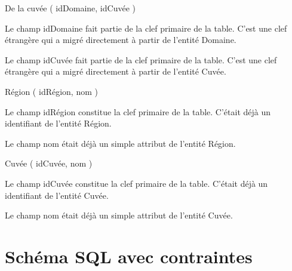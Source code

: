 \documentclass[11pt]{article}
\begin{document}
{De la cuvée} ( {idDomaine}, {idCuvée} )

Le champ idDomaine fait partie de la clef primaire de la table. C'est
une clef étrangère qui a migré directement à partir de l'entité Domaine.

Le champ idCuvée fait partie de la clef primaire de la table. C'est une
clef étrangère qui a migré directement à partir de l'entité Cuvée.

{Région} ( {idRégion}, {nom} )

Le champ idRégion constitue la clef primaire de la table. C'était déjà
un identifiant de l'entité Région.

Le champ nom était déjà un simple attribut de l'entité Région.

{Cuvée} ( {idCuvée}, {nom} )

Le champ idCuvée constitue la clef primaire de la table. C'était déjà un
identifiant de l'entité Cuvée.

Le champ nom était déjà un simple attribut de l'entité Cuvée.

\hypertarget{schuxe9ma-sql-avec-contraintes}{%
\section{Schéma SQL avec
contraintes}\label{schuxe9ma-sql-avec-contraintes}}
\end{document}
